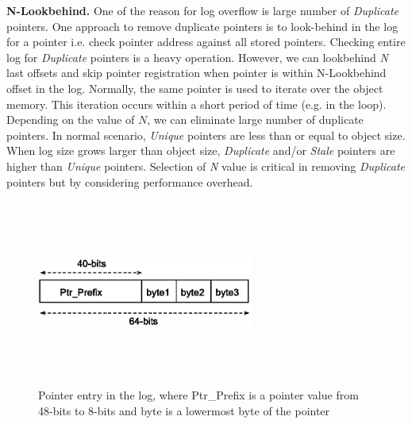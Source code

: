 \textbf{N-Lookbehind.} 
One of the reason for log overflow is large number of \textit{Duplicate} pointers. One approach to remove duplicate pointers is to look-behind in the log for a pointer i.e. check pointer address against all stored pointers. Checking entire log for \textit{Duplicate} pointers is a heavy operation. However, we can lookbehind \emph{N} last offsets and skip pointer registration when pointer is within N-Lookbehind offset in the log. Normally, the same pointer is used to iterate over the object memory. This iteration occurs within a short period of time (e.g. in the loop). Depending on the value of $N$, we can eliminate large number of duplicate pointers. In normal scenario, \textit{Unique} pointers are less than or equal to object size. When log size grows larger than object size, \textit{Duplicate} and/or \textit{Stale} pointers are higher than \textit{Unique} pointers. Selection of \emph{N} value is critical in removing \emph{Duplicate} pointers but by considering performance overhead. \\

\begin{figure}[t]
\center
  \includegraphics[width=2.8in,height=2.4in,keepaspectratio]{figures/pointer-entry.eps}
  \caption{Pointer entry in the log, where Ptr\_Prefix is a pointer value from 48-bits to 8-bits and byte is a lowermost byte of the pointer}
  \label{fig:pointer_entry}
  \vspace{-1em}
\end{figure}  

